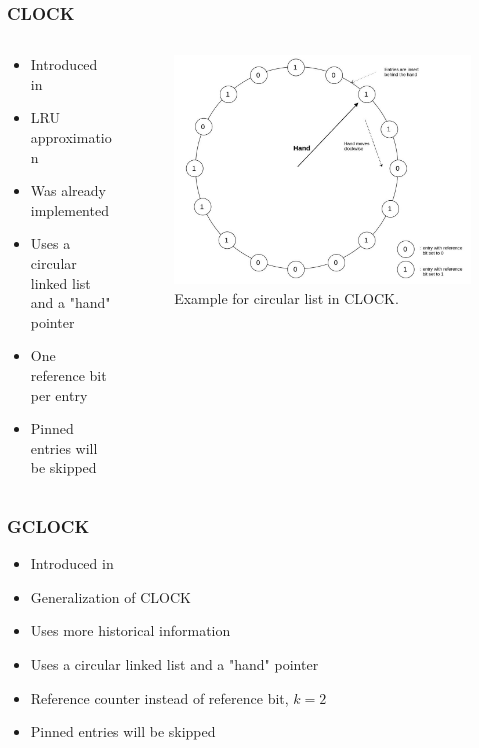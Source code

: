 \documentclass[
	aspectratio=169,
	compress,
]{beamer}
\newcommand{\navframetitle}[1]{\frametitle{#1\hfill{\footnotesize\lastsection{}}}}
\begin{document}
\begin{frame}
	\navframetitle{CLOCK}

	\begin{columns}
		\begin{column}{0.5\textwidth}
			\begin{itemize}
				\item Introduced in \cite{corbato1968paging}				
				\item LRU approximation
				\item Was already implemented
				\item Uses a circular linked list and a "hand" pointer
				\item One reference bit per entry
				\item Pinned entries will be skipped
			\end{itemize}
		\end{column}
		\begin{column}{0.5\textwidth}
			\begin{figure}[ht]
    			\centering
    			\includegraphics[scale=0.2]{clock.jpg}
    			\caption{Example for circular list in CLOCK.}
        		\label{fig:circular list for CLOCK}
			\end{figure}			
		\end{column}
	\end{columns}
\end{frame}

\begin{frame}
	\navframetitle{GCLOCK}
	
	\begin{itemize}
		\item Introduced in \cite{smith1978sequentiality}				
		\item Generalization of CLOCK 
		\item Uses more historical information
		\item Uses a circular linked list and a "hand" pointer
		\item Reference counter instead of reference bit, $k = 2$
		\item Pinned entries will be skipped
	\end{itemize}	
\end{frame}
\end{document}
